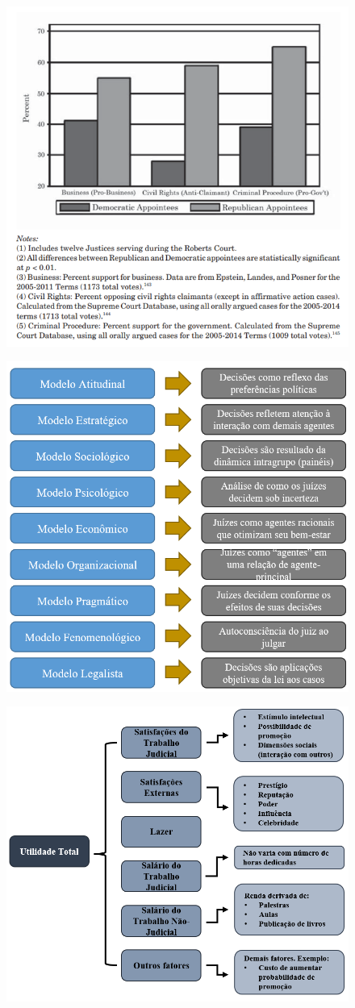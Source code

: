 \documentclass[a4paper,12pt]{article}[abntex2]
\begin{document}
\begin{figure}[H]
    \centering
    \includegraphics[width=0.7\linewidth]{Imagens/a13i7.png}
\end{figure}

\begin{figure}[H]
    \centering
    \includegraphics[width=0.7\linewidth]{Imagens/a13i8.png}
\end{figure}

\begin{figure}[H]
    \centering
    \includegraphics[width=0.7\linewidth]{Imagens/a13i9.png}
\end{figure}
\end{document}

